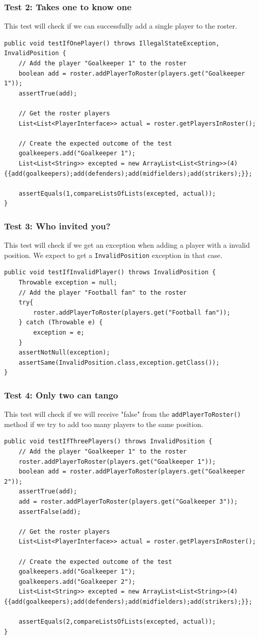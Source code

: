 \documentclass{article}
\begin{document}
\subsubsection{Test 2: Takes one to know one}
This test will check if we can successfully add a single player to the roster.
\begin{lstlisting}
public void testIfOnePlayer() throws IllegalStateException, InvalidPosition {
	// Add the player "Goalkeeper 1" to the roster
	boolean add = roster.addPlayerToRoster(players.get("Goalkeeper 1"));
	assertTrue(add);
	
	// Get the roster players
	List<List<PlayerInterface>> actual = roster.getPlayersInRoster();
	
	// Create the expected outcome of the test
	goalkeepers.add("Goalkeeper 1");
	List<List<String>> excepted = new ArrayList<List<String>>(4) {{add(goalkeepers);add(defenders);add(midfielders);add(strikers);}};
	
	assertEquals(1,compareListsOfLists(excepted, actual));
}
\end{lstlisting}

\subsubsection{Test 3: Who invited you?}
This test will check if we get an exception when adding a player with a invalid position. We expect to get a \texttt{InvalidPosition} exception in that case.
\begin{lstlisting}
public void testIfInvalidPlayer() throws InvalidPosition {
	Throwable exception = null;
	// Add the player "Football fan" to the roster
	try{
		roster.addPlayerToRoster(players.get("Football fan"));
	} catch (Throwable e) {
		exception = e;
	}
	assertNotNull(exception);
	assertSame(InvalidPosition.class,exception.getClass());
}
\end{lstlisting}

\subsubsection{Test 4: Only two can tango}
This test will check if we will receive "false" from the \texttt{addPlayerToRoster()} method if we try to add too many players to the same position.
\begin{lstlisting}
public void testIfThreePlayers() throws InvalidPosition {
	// Add the player "Goalkeeper 1" to the roster
	roster.addPlayerToRoster(players.get("Goalkeeper 1"));
	boolean add = roster.addPlayerToRoster(players.get("Goalkeeper 2"));
	assertTrue(add);
	add = roster.addPlayerToRoster(players.get("Goalkeeper 3"));
	assertFalse(add);
	
	// Get the roster players
	List<List<PlayerInterface>> actual = roster.getPlayersInRoster();
	
	// Create the expected outcome of the test
	goalkeepers.add("Goalkeeper 1");
	goalkeepers.add("Goalkeeper 2");
	List<List<String>> excepted = new ArrayList<List<String>>(4) {{add(goalkeepers);add(defenders);add(midfielders);add(strikers);}};
	
	assertEquals(2,compareListsOfLists(excepted, actual));
}
\end{lstlisting}
\end{document}
